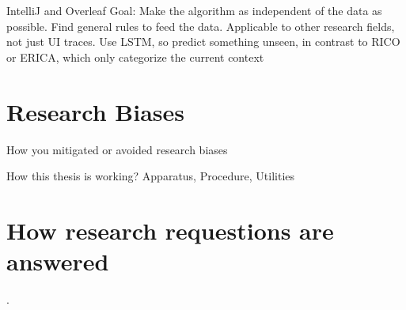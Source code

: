 IntelliJ and Overleaf
Goal: Make the algorithm as independent of the data as possible.
Find general rules to feed the data.
Applicable to other research fields, not just UI traces.
Use LSTM, so predict something unseen, in contrast to RICO or ERICA, which only categorize the current context


\section{Research Biases}
How you mitigated or avoided research biases

How this thesis is working?
Apparatus, Procedure, Utilities


\section{How research requestions are answered}
.
